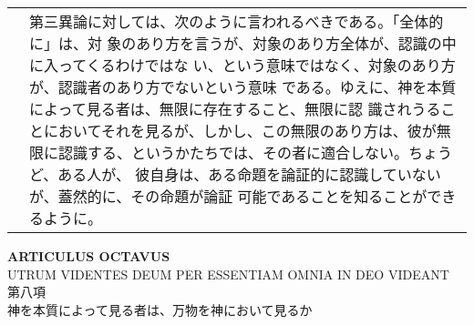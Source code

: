 \documentclass[10pt]{jsarticle} %
\begin{document}
\begin{longtable}{p{21em}p{21em}}
&


第三異論に対しては、次のように言われるべきである。「全体的に」は、対
象のあり方を言うが、対象のあり方全体が、認識の中に入ってくるわけではな
い、という意味ではなく、対象のあり方が、認識者のあり方でないという意味
である。ゆえに、神を本質によって見る者は、無限に存在すること、無限に認
識されうることにおいてそれを見るが、しかし、この無限のあり方は、彼が無
限に認識する、というかたちでは、その者に適合しない。ちょうど、ある人が、
彼自身は、ある命題を論証的に認識していないが、蓋然的に、その命題が論証
可能であることを知ることができるように。


\end{longtable}

\newpage
{}

\begin{center}
 {\Large {\bf ARTICULUS OCTAVUS}}\\
{\large UTRUM VIDENTES DEUM PER ESSENTIAM OMNIA IN DEO VIDEANT\\
第八項\\
神を本質によって見る者は、万物を神において見るか}
\end{center}
\end{document}
